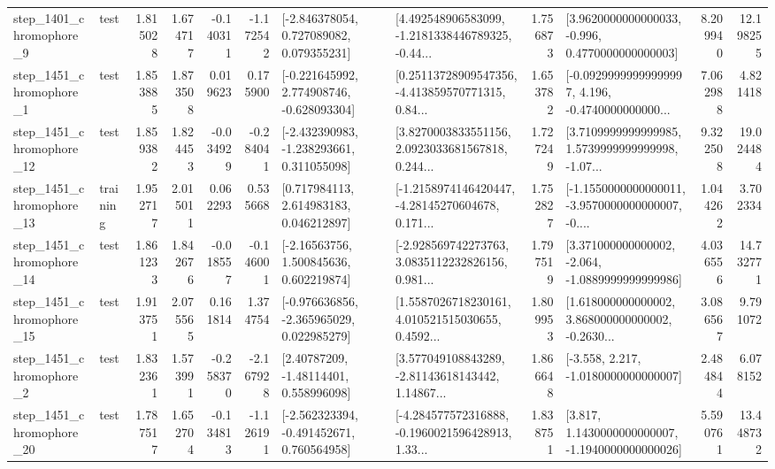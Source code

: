 \begin{tabular}{llrrrrllrlrr}
  step\_1401\_chromophore\_9 &      test &      1.815028 &    1.674717 &     -0.140311 & -1.172542 &    [-2.846378054, 0.727089082, 0.079355231] &  [4.492548906583099, -1.2181338446789325, -0.44... &       1.756873 &   [3.9620000000000033, -0.996, 0.4770000000000003] &            8.209940 &         12.198255 \\
  step\_1451\_chromophore\_1 &      test &      1.853885 &    1.873508 &      0.019623 &  0.175900 &   [-0.221645992, 2.774908746, -0.628093304] &  [0.25113728909547356, -4.413859570771315, 0.84... &       1.653782 &  [-0.09299999999999997, 4.196, -0.4740000000000... &            7.062988 &          4.821418 \\
 step\_1451\_chromophore\_12 &      test &      1.859382 &    1.824453 &     -0.034929 & -0.284041 &   [-2.432390983, -1.238293661, 0.311055098] &  [3.8270003833551156, 2.0923033681567818, 0.244... &       1.727249 &  [3.7109999999999985, 1.5739999999999998, -1.07... &            9.322508 &         19.024484 \\
 step\_1451\_chromophore\_13 &  training &      1.952717 &    2.015011 &      0.062293 &  0.535668 &     [0.717984113, 2.614983183, 0.046212897] &  [-1.2158974146420447, -4.28145270604678, 0.171... &       1.752827 &  [-1.1550000000000011, -3.9570000000000007, -0.... &            1.044262 &          3.702334 \\
 step\_1451\_chromophore\_14 &      test &      1.861233 &    1.842676 &     -0.018557 & -0.146001 &     [-2.16563756, 1.500845636, 0.602219874] &  [-2.928569742273763, 3.0835112232826156, 0.981... &       1.797519 &   [3.371000000000002, -2.064, -1.0889999999999986] &            4.036556 &         14.732771 \\
 step\_1451\_chromophore\_15 &      test &      1.913751 &    2.075565 &      0.161814 &  1.374754 &   [-0.976636856, -2.365965029, 0.022985279] &  [1.5587026718230161, 4.010521515030655, 0.4592... &       1.809953 &  [1.618000000000002, 3.868000000000002, -0.2630... &            3.086567 &          9.791072 \\
  step\_1451\_chromophore\_2 &      test &      1.832361 &    1.573991 &     -0.258370 & -2.167928 &      [2.40787209, -1.48114401, 0.558996098] &  [3.577049108843289, -2.81143618143442, 1.14867... &       1.866648 &               [-3.558, 2.217, -1.0180000000000007] &            2.484844 &          6.078152 \\
 step\_1451\_chromophore\_20 &      test &      1.787517 &    1.652704 &     -0.134813 & -1.126191 &   [-2.562323394, -0.491452671, 0.760564958] &  [-4.284577572316888, -0.1960021596428913, 1.33... &       1.838751 &   [3.817, 1.1430000000000007, -1.1940000000000026] &            5.590761 &         13.448732 \\

\end{tabular}
